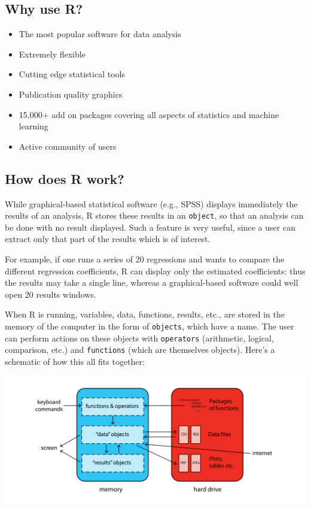 \documentclass[
]{book}
\providecommand{\tightlist}{%
  \setlength{\itemsep}{0pt}\setlength{\parskip}{0pt}}
\begin{document}
\hypertarget{why-use-r}{%
\subsection{Why use R?}\label{why-use-r}}

\begin{itemize}
\tightlist
\item
  The most popular software for data analysis
\item
  Extremely flexible
\item
  Cutting edge statistical tools
\item
  Publication quality graphics
\item
  15,000+ add on packages covering all aspects of statistics and machine learning
\item
  Active community of users
\end{itemize}

\hypertarget{how-does-r-work}{%
\subsection{How does R work?}\label{how-does-r-work}}

While graphical-based statistical software (e.g., SPSS) displays immediately
the results of an analysis, R stores these results in an \texttt{object}, so that an
analysis can be done with no result displayed. Such a feature is very useful,
since a user can extract only that part of the results which is of interest.

For example, if one runs a series of 20 regressions and wants to compare the
different regression coefficients, R can display only the estimated coefficients:
thus the results may take a single line, whereas a graphical-based software could well
open 20 results windows.

When R is running, variables, data, functions, results, etc., are stored in
the memory of the computer in the form of \texttt{objects}, which have a name.
The user can perform actions on these objects with \texttt{operators} (arithmetic, logical,
comparison, etc.) and \texttt{functions} (which are themselves objects). Here's a schematic
of how this all fits together:

\includegraphics{R/Rintro/images/R_works.png}
\end{document}
